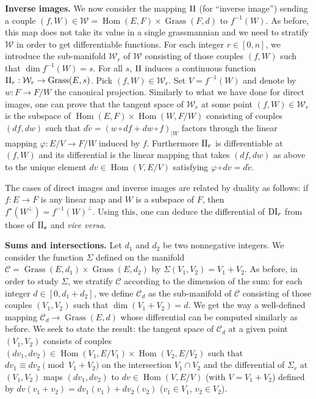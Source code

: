 \documentclass{sig-alternate}
\DeclareMathOperator{\Hom}{Hom}
\DeclareMathOperator{\Grass}{Grass}
\begin{document}
\medskip

\noindent
{\bf Inverse images.}
We now consider the mapping $\text{\rm II}$ (for ``inverse image'') sending a 
couple $(f,W) \in \mathcal W = \Hom(E,F) \times \Grass(F,d)$ to 
$f^{-1}(W)$. As before, this map does not take its value in a single 
grassmannian and we need to stratify $\mathcal W$ in order to get 
differentiable functions. For each integer $r \in [0,n]$, we introduce 
the sub-manifold $\mathcal W_r$ of $\mathcal W$ consisting of those 
couples $(f,W)$ such that $\dim f^{-1}(W) = s$. For all $s$, $\text{\rm II}$ 
induces a continuous function
$\II_r : \mathcal W_r \to \Grass(E,s)$.
Pick $(f,W) \in \mathcal W_r$. Set $V = f^{-1}(W)$ and denote by $w : F 
\to F/W$ the canonical projection.
Similarly to what we have done for direct images, one can prove that
the tangent space of $\mathcal W_r$ at some point $(f,W) \in \mathcal
W_r$ is the subspace of $\Hom(E,F) \times \Hom(W,F/W)$ consisting of 
couples $(df,dw)$ such that
$d \tilde v = (w \circ df + dw \circ f)_{|W}$
factors through the linear mapping $\varphi : E/V \to F/W$ induced by 
$f$. Furthermore $\text{\rm II}_r$ is differentiable at $(f,W)$ and its 
differential is the linear mapping that takes $(df,dw)$ as above to the 
unique element $dv \in \Hom(V,E/V)$ satisfying $\varphi \circ dv =
d\tilde v$.

The cases of direct images and inverse images are related by duality
as follows: if $f : E \to F$ is any linear map and $W$ is a subspace
of $F$, then $f^\star(W^\perp) = f^{-1}(W)^\perp$. Using this, one 
can deduce the differential of $\text{\rm DI}_r$ from those of $\text{\rm II}_s$ and 
\emph{vice versa}.


\medskip

\noindent
{\bf Sums and intersections.}
Let $d_1$ and $d_2$ be two nonnegative integers. We consider the 
function $\Sigma$ defined on the manifold $\mathcal C = \Grass(E,d_1) 
\times \Grass(E,d_2)$ by $\Sigma(V_1, V_2) = V_1 + V_2$. As before, in 
order to study $\Sigma$, we stratify $\mathcal C$ according to the 
dimension of the sum: for each integer $d \in [0, d_1+d_2]$, we define 
$\mathcal C_d$ as the sub-manifold of $\mathcal C$ consisting of those 
couples $(V_1, V_2)$ such that $\dim(V_1 + V_2) = d$. We get the way a 
well-defined mapping $\mathcal C_d \to \Grass(E,d)$ whose differential
can be computed similarly as before. We seek to state the result: the
tangent space of $\mathcal C_d$ at a given point $(V_1, V_2)$ consists 
of couples $(dv_1, dv_2) \in \Hom(V_1, E/V_1)
\times \Hom(V_2, E/V_2)$ such that $dv_1 \equiv dv_2 \pmod{V_1 + V_2}$ 
on the intersection $V_1 \cap V_2$ and the differential of $\Sigma_r$
at $(V_1, V_2)$ maps $(dv_1, dv_2)$ to $dv \in \Hom(V, E/V)$ (with $V
= V_1 + V_2$) defined by $dv(v_1 + v_2) = dv_1(v_1) + dv_2(v_2)$ ($v_1
\in V_1$, $v_2 \in V_2$).
\end{document}
